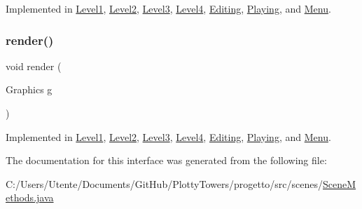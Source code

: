 Implemented in \hyperlink{classscenes_1_1_level1_a87a07291794e15052db67f945d90853e}{Level1}, \hyperlink{classscenes_1_1_level2_a87a07291794e15052db67f945d90853e}{Level2}, \hyperlink{classscenes_1_1_level3_a87a07291794e15052db67f945d90853e}{Level3}, \hyperlink{classscenes_1_1_level4_a87a07291794e15052db67f945d90853e}{Level4}, \hyperlink{classscenes_1_1_editing_a87a07291794e15052db67f945d90853e}{Editing}, \hyperlink{classscenes_1_1_playing_a87a07291794e15052db67f945d90853e}{Playing}, and \hyperlink{classscenes_1_1_menu_a87a07291794e15052db67f945d90853e}{Menu}.

\mbox{\label{interfacescenes_1_1_scene_methods_a203b6ad9d5e4d54dd1152986eec4dedc}} 
\subsubsection{\texorpdfstring{render()}{render()}}
{\footnotesize\ttfamily void render (\begin{DoxyParamCaption}\item[{Graphics}]{g }\end{DoxyParamCaption})}



Implemented in \hyperlink{classscenes_1_1_level1_a203b6ad9d5e4d54dd1152986eec4dedc}{Level1}, \hyperlink{classscenes_1_1_level2_a203b6ad9d5e4d54dd1152986eec4dedc}{Level2}, \hyperlink{classscenes_1_1_level3_a203b6ad9d5e4d54dd1152986eec4dedc}{Level3}, \hyperlink{classscenes_1_1_level4_a203b6ad9d5e4d54dd1152986eec4dedc}{Level4}, \hyperlink{classscenes_1_1_editing_a203b6ad9d5e4d54dd1152986eec4dedc}{Editing}, \hyperlink{classscenes_1_1_playing_a203b6ad9d5e4d54dd1152986eec4dedc}{Playing}, and \hyperlink{classscenes_1_1_menu_a203b6ad9d5e4d54dd1152986eec4dedc}{Menu}.



The documentation for this interface was generated from the following file\+:\begin{DoxyCompactItemize}
\item 
C\+:/\+Users/\+Utente/\+Documents/\+Git\+Hub/\+Plotty\+Towers/progetto/src/scenes/\hyperlink{_scene_methods_8java}{Scene\+Methods.\+java}\end{DoxyCompactItemize}
